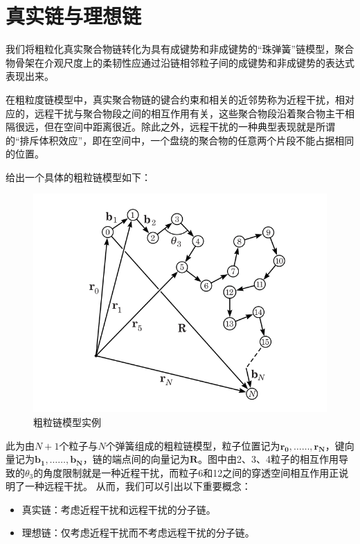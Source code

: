 \section{真实链与理想链}

我们将粗粒化真实聚合物链转化为具有成键势和非成键势的“珠弹簧”链模型，聚合物骨架在介观尺度上的柔韧性应通过沿链相邻粒子间的成键势和非成键势的表达式表现出来。

在粗粒度链模型中，真实聚合物链的键合约束和相关的近邻势称为近程干扰，相对应的，远程干扰与聚合物段之间的相互作用有关，这些聚合物段沿着聚合物主干相隔很远，但在空间中距离很近。除此之外，远程干扰的一种典型表现就是所谓的“排斥体积效应”，即在空间中，一个盘绕的聚合物的任意两个片段不能占据相同的位置。

给出一个具体的粗粒链模型如下：

\begin{figure}[h]
\centering
\includegraphics[scale=0.5
]{Contents/chapter2/figures/2-1.png}
\caption{粗粒链模型实例}
\end{figure}

此为由$N+1$个粒子与$N$个弹簧组成的粗粒链模型，粒子位置记为$\mathbf{r_0},……,\mathbf{r_N}$，键向量记为$\mathbf{b_1},……,\mathbf{b_N}$，链的端点间的向量记为$\mathbf{R}$。图中由2、3、4粒子的相互作用导致的$\theta_3$的角度限制就是一种近程干扰，而粒子6和12之间的穿透空间相互作用正说明了一种远程干扰。
从而，我们可以引出以下重要概念：
\begin{itemize}
	\item 真实链：考虑近程干扰和远程干扰的分子链。
	\item 理想链：仅考虑近程干扰而不考虑远程干扰的分子链。
\end{itemize}

